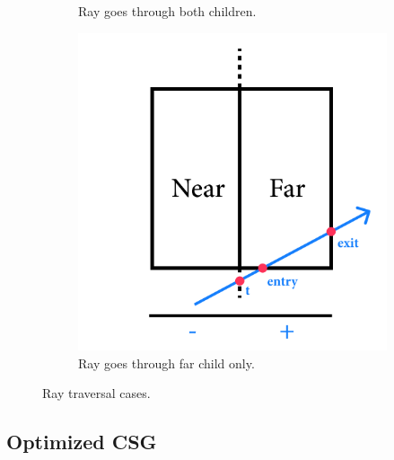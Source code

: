 \documentclass[a4paper,11pt,oneside]{article}
\begin{document}
\begin{figure}[ht]
\begin{subfigure}[b]{0.3\textwidth}
		\caption{Ray goes through both children.}
		\label{sec4.3:both-children}
	\end{subfigure}
	\hfill
	\begin{subfigure}[b]{0.3\textwidth}
		\centering
		\includegraphics[width=\textwidth]{section4/4.3/far-intersection.png}
		\caption{Ray goes through far child only.}
		\label{sec4.3:far-child}
	\end{subfigure}
	\hfill
	\caption{Ray traversal cases.}
	\label{sec4.3:ray-traversal-cases}
\end{figure}

\subsection{Optimized CSG}
\end{document}
